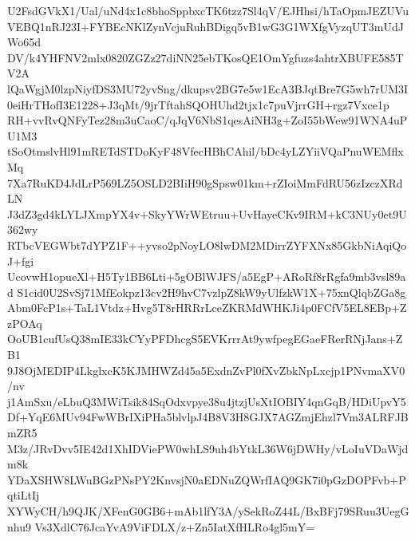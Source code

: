 U2FsdGVkX1/Ual/uNd4x1c8bhoSppbxcTK6tzz7Sl4qV/EJHhsi/hTaOpmJEZUVu
VEBQ1nRJ23I+FYBEcNKlZynVcjuRuhBDigq5vB1wG3G1WXfgVyzqUT3mUdJWo65d
DV/k4YHFNV2mlx0820ZGZz27diNN25ebTKosQE1OmYgfuzs4ahtrXBUFE585TV2A
lQaWgjM0lzpNiyfDS3MU72yvSng/dkupsv2BG7e5w1EcA3BJqtBre7G5wh7rUM3I
0eiHrTHofI3E1228+J3qMt/9jrTftahSQOHUhd2tjx1c7puVjrrGH+rgz7Vxce1p
RH+vvRvQNFyTez28m3uCaoC/qJqV6NbS1qesAiNH3g+ZoI55bWew91WNA4uPU1M3
tSoOtmslvHl91mRETdSTDoKyF48VfecHBhCAhil/bDc4yLZYiiVQaPnuWEMflxMq
7Xa7RuKD4JdLrP569LZ5OSLD2BIiH90gSpsw01km+rZIoiMmFdRU56zIzczXRdLN
J3dZ3gd4kLYLJXmpYX4v+SkyYWrWEtruu+UvHayeCKv9IRM+kC3NUy0et9U362wy
RTbcVEGWbt7dYPZ1F++yvso2pNoyLO8lwDM2MDirrZYFXNx85GkbNiAqiQoJ+fgi
UcovwH1opueXl+H5Ty1BB6Lti+5gOBlWJFS/a5EgP+ARoRf8rRgfa9mb3vsl89ad
S1cid0U2SvSj71MfEokpz13cv2H9hvC7vzlpZ8kW9yUlfzkW1X+75xnQlqbZGa8g
Abm0FcP1s+TaL1Vtdz+Hvg5T8rHRRrLceZKRMdWHKJi4p0FCfV5EL8EBp+ZzPOAq
OoUB1cufUsQ38mIE33kCYyPFDhcgS5EVKrrrAt9ywfpegEGaeFRerRNjJans+ZB1
9J8OjMEDIP4LkglxcK5KJMHWZd45a5ExdnZvPl0fXvZbkNpLxcjp1PNvmaXV0/nv
j1AmSxu/eLbuQ3MWiTsik84SqOdxvpye38u4jtzjUsXtIOBIY4qnGqB/HDiUpvY5
Df+YqE6MUv94FwWBrIXiPHa5blvlpJ4B8V3H8GJX7AGZmjEhzl7Vm3ALRFJBmZR5
M3z/JRvDvv5IE42d1XhIDViePW0whLS9uh4bYtkL36W6jDWHy/vLoIuVDaWjdm8k
YDaXSHW8LWuBGzPNsPY2KnvsjN0aEDNuZQWrfIAQ9GK7i0pGzDOPFvb+PqtiLtIj
XYWyCH/h9QJK/XFenG0GB6+mAb1lfY3A/ySekRoZ44L/BxBFj79SRuu3UegGnhu9
Vs3XdlC76JcaYvA9ViFDLX/z+Zn5IatXfHLRo4gl5mY=
